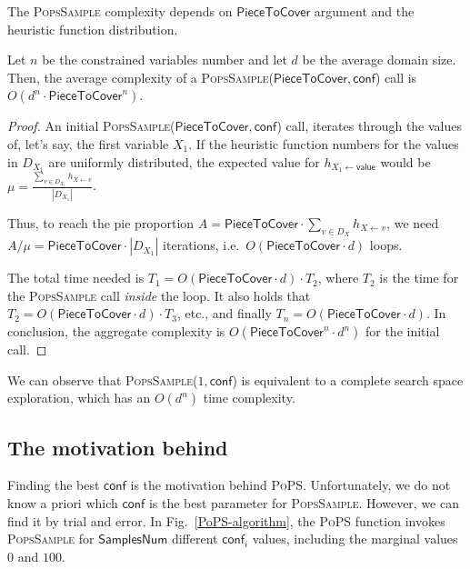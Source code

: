 \documentclass{ws-ijait}
\begin{document}
The \textsc{PopsSample} complexity depends on
$\mathsf{PieceToCover}$ argument and the heuristic function
distribution.
\begin{lemma}
  Let $n$ be the constrained variables number and let $d$ be
  the average domain size. Then, the average complexity of a
  \textsc{PopsSample}($\mathsf{PieceToCover},\mathsf{conf}$)
  call is $O(d^n \cdot \mathsf{PieceToCover}^n)$.
\end{lemma}
\begin{proof}
  An initial
  \textsc{PopsSample}($\mathsf{PieceToCover},\mathsf{conf}$)
  call, iterates through the values of, let's say, the first
  variable $X_1$. If the heuristic function numbers for the
  values in $D_{X_1}$ are uniformly distributed, the
  expected value for $h_{X_1 \gets \mathsf{value}}$ would be
  $\mu = \frac{\sum_{v \in D_{X_1}} h_{X \gets
  v}}{|D_{X_1}|}$.

  Thus, to reach the pie proportion $A =
  \mathsf{PieceToCover} \cdot \sum_{v \in D_X} h_{X \gets
  v}$, we need $A / \mu = \mathsf{PieceToCover} \cdot
  |D_{X_1}|$ iterations, i.e.\ 
  $O(\mathsf{PieceToCover} \cdot d)$ loops.

  The total time needed is $T_1 = O(\mathsf{PieceToCover}
  \cdot d) \cdot T_2$, where $T_2$ is the time for the
  \textsc{PopsSample} call \emph{inside} the loop. It also
  holds that $T_2 = O(\mathsf{PieceToCover} \cdot d) \cdot
  T_3$, etc., and finally $T_n = O(\mathsf{PieceToCover}
  \cdot d)$. In conclusion, the aggregate complexity is
  $O(\mathsf{PieceToCover}^n \cdot d^n)$ for the initial
  call.
\end{proof}
We can observe that \textsc{PopsSample}($1,\mathsf{conf}$)
is equivalent to a complete search space exploration, which
has an $O(d^n)$ time complexity.

\subsection{The motivation behind \PoPS\label{sampling}}

Finding the best $\mathsf{conf}$ is the motivation behind
\textsc{PoPS}. Unfortunately, we do not know a priori which
$\mathsf{conf}$ is the best parameter for
\textsc{PopsSample}. However, we can find it by trial and
error. In Fig.~\ref{PoPS-algorithm}, the \textsc{PoPS}
function invokes \textsc{PopsSample} for
$\mathsf{SamplesNum}$ different $\mathsf{conf}_i$ values,
including the marginal values $0$ and $100$.
\end{document}
